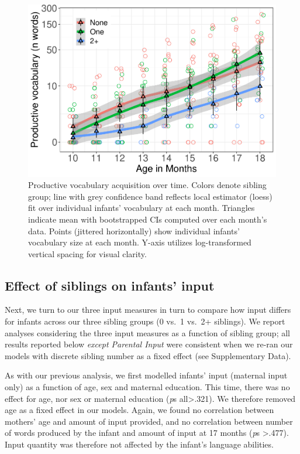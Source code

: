 \documentclass[man,floatsintext]{apa6}
\begin{document}
\begin{figure}
\centering
\includegraphics{SiblingsStudyText_files/figure-latex/Figure-SibGroup-1.pdf}
\caption{\label{fig:Figure-SibGroup}Productive vocabulary acquisition over time. Colors denote sibling group; line with grey confidence band reflects local estimator (loess) fit over individual infants' vocabulary at each month. Triangles indicate mean with bootstrapped CIs computed over each month's data. Points (jittered horizontally) show individual infants' vocabulary size at each month. Y-axis utilizes log-transformed vertical spacing for visual clarity.}
\end{figure}

\hypertarget{effect-of-siblings-on-infants-input}{%
\subsection{Effect of siblings on infants' input}\label{effect-of-siblings-on-infants-input}}

Next, we turn to our three input measures in turn to compare how input differs for infants across our three sibling groups (0 vs.~1 vs.~2+ siblings). We report analyses considering the three input measures as a function of sibling group; all results reported below \emph{except Parental Input} were consistent when we re-ran our models with discrete sibling number as a fixed effect (see Supplementary Data).

As with our previous analysis, we first modelled infants' input (maternal input only) as a function of age, sex and maternal education. This time, there was no effect for age, nor sex or maternal education (\emph{p}s all\textgreater{}.321). We therefore removed age as a fixed effect in our models. Again, we found no correlation between mothers' age and amount of input provided, and no correlation between number of words produced by the infant and amount of input at 17 months (\emph{p}s \textgreater{}.477). Input quantity was therefore not affected by the infant's language abilities.
\end{document}

